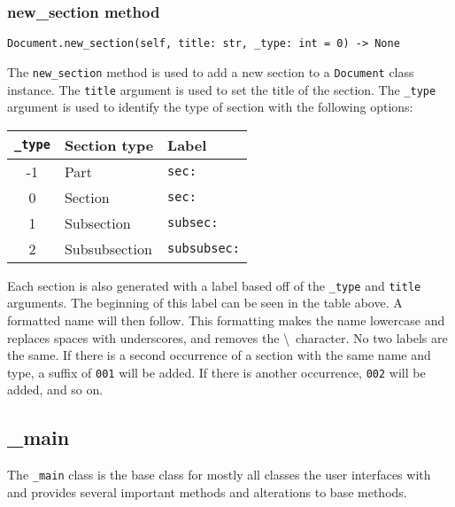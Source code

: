 \documentclass{article}
\begin{document}
\subsubsection{new\_section method}\label{subsubsec:new_section_method}
\begin{verbatim}
Document.new_section(self, title: str, _type: int = 0) -> None
\end{verbatim}
The \verb|new_section| method is used to add a new section to a \verb|Document| class instance. The \verb|title| argument is used to set the title of the section. The \verb|_type| argument is used to identify the type of section with the following options:
\begin{center}
\begin{tabular}{| c | l | l |}
\hline
{\verb|_type|} & Section type & Label \\ \hline
-1 & Part & \verb|sec:| \\
0 & Section & \verb|sec:| \\
1 & Subsection & \verb|subsec:| \\
2 & Subsubsection & \verb|subsubsec:| \\
\hline
\end{tabular}
\end{center}
Each section is also generated with a label based off of the \verb|_type| and \verb|title| arguments. The beginning of this label can be seen in the table above. A formatted name will then follow. This formatting makes the name lowercase and replaces spaces with underscores, and removes the \textbackslash\ character. No two labels are the same. If there is a second occurrence of a section with the same name and type, a suffix of \verb|001| will be added. If there is another occurrence, \verb|002| will be added, and so on.
\subsection{\_main}\label{subsec:_main}
The \verb|_main| class is the base class for mostly all classes the user interfaces with and provides several important methods and alterations to base methods.
\end{document}
